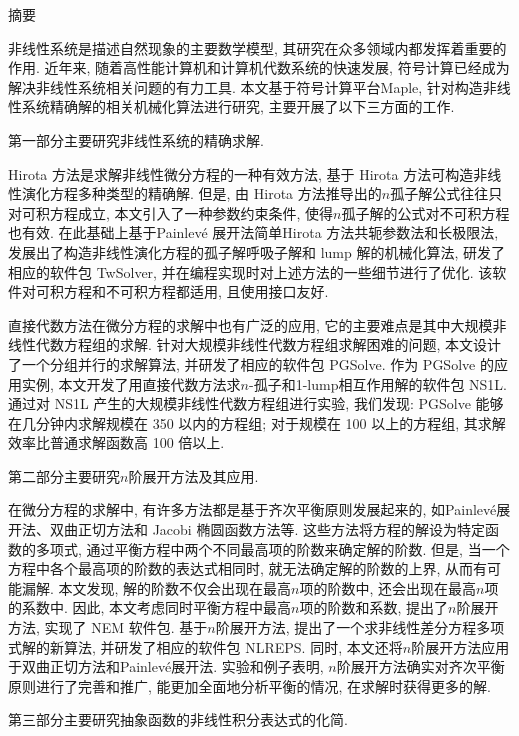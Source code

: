 {}
\centerline{\heiti 摘\quad 要}

\linespread{1.4} \bigskip

非线性系统是描述自然现象的主要数学模型, 其研究在众多领域内都发挥着重要的作用. 近年来, 随着高性能计算机和计算机代数系统的快速发展, 符号计算已经成为解决非线性系统相关问题的有力工具. 本文基于符号计算平台Maple, 针对构造非线性系统精确解的相关机械化算法进行研究, 主要开展了以下三方面的工作.

第一部分主要研究非线性系统的精确求解.

Hirota 方法是求解非线性微分方程的一种有效方法, 基于 Hirota 方法可构造非线性演化方程多种类型的精确解. 但是, 由 Hirota 方法推导出的$n$孤子解公式往往只对可积方程成立, 本文引入了一种参数约束条件, 使得$n$孤子解的公式对不可积方程也有效. 在此基础上基于Painlevé 展开法\D 简单Hirota 方法\D 共轭参数法和长极限法, 发展出了构造非线性演化方程的孤子解\D 呼吸子解和 lump 解的机械化算法, 研发了相应的软件包 TwSolver, 并在编程实现时对上述方法的一些细节进行了优化. 该软件对可积方程和不可积方程都适用, 且使用接口友好. 

直接代数方法在微分方程的求解中也有广泛的应用, 它的主要难点是其中大规模非线性代数方程组的求解. 针对大规模非线性代数方程组求解困难的问题, 本文设计了一个分组并行的求解算法, 并研发了相应的软件包 PGSolve. 作为 PGSolve 的应用实例, 本文开发了用直接代数方法求$n$-孤子和1-lump相互作用解的软件包 NS1L. 通过对 NS1L 产生的大规模非线性代数方程组进行实验, 我们发现: PGSolve 能够在几分钟内求解规模在 350 以内的方程组; 对于规模在 100 以上的方程组, 其求解效率比普通求解函数高 100 倍以上. 

第二部分主要研究$n$阶展开方法及其应用. 

在微分方程的求解中, 有许多方法都是基于齐次平衡原则发展起来的, 如Painlevé展开法、双曲正切方法和 Jacobi 椭圆函数方法等. 这些方法将方程的解设为特定函数的多项式, 通过平衡方程中两个不同最高项的阶数来确定解的阶数. 但是, 当一个方程中各个最高项的阶数的表达式相同时, 就无法确定解的阶数的上界, 从而有可能漏解. 本文发现, 解的阶数不仅会出现在最高$n$项的阶数中, 还会出现在最高$n$项的系数中. 因此, 本文考虑同时平衡方程中最高$n$项的阶数和系数, 提出了$n$阶展开方法, 实现了 NEM 软件包. 基于$n$阶展开方法, 提出了一个求非线性差分方程多项式解的新算法, 并研发了相应的软件包 NLREPS. 同时, 本文还将$n$阶展开方法应用于双曲正切方法和Painlevé展开法. 实验和例子表明, $n$阶展开方法确实对齐次平衡原则进行了完善和推广, 能更加全面地分析平衡的情况, 在求解时获得更多的解. 

第三部分主要研究抽象函数的非线性积分表达式的化简.

